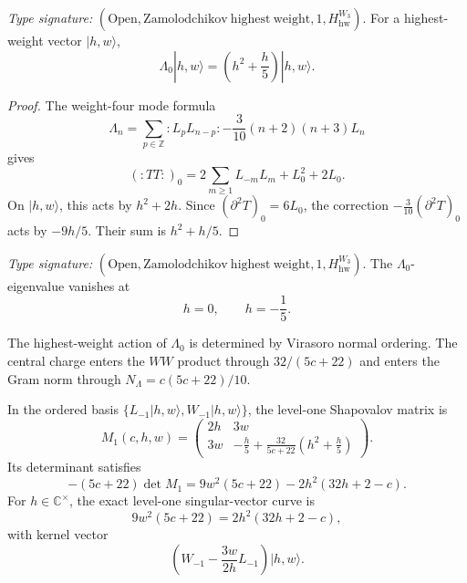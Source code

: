 \begin{proposition}
\label{prop:w3hol-lambda-on-primaries}
\emph{Type signature:}
\((\mathrm{Open},\mathrm{Zamolodchikov\ highest\ weight},1,
H_{\mathrm{hw}}^{W_3})\).
For a highest-weight vector \(|h,w\rangle\),
\begin{equation}\label{eq:w3hol-lambda-action}
\Lambda_0|h,w\rangle
=\left(h^2+\frac h5\right)|h,w\rangle.
\end{equation}
\end{proposition}

\begin{proof}
The weight-four mode formula
\[
\Lambda_n
=\sum_{p\in\mathbb Z}{:}L_pL_{n-p}{:}
-\frac3{10}(n+2)(n+3)L_n
\]
gives
\begin{equation}\label{eq:w3hol-tt-zero-mode}
({:}TT{:})_0
=2\sum_{m\geq1}L_{-m}L_m+L_0^2+2L_0.
\end{equation}
On \(|h,w\rangle\), this acts by \(h^2+2h\).  Since
\((\partial^2T)_0=6L_0\), the correction
\(-\frac3{10}(\partial^2T)_0\) acts by \(-9h/5\).  Their sum is
\(h^2+h/5\).
\end{proof}

\begin{corollary}
\label{cor:w3hol-lambda-roots}
\emph{Type signature:}
\((\mathrm{Open},\mathrm{Zamolodchikov\ highest\ weight},1,
H_{\mathrm{hw}}^{W_3})\).
The \(\Lambda_0\)-eigenvalue vanishes at
\[
h=0,\qquad h=-\frac15.
\]
\end{corollary}

\begin{remark}
\label{rem:w3hol-lambda-c-independent}
The highest-weight action of \(\Lambda_0\) is determined by Virasoro
normal ordering.  The central charge enters the \(WW\) product through
\(32/(5c+22)\) and enters the Gram norm through
\(N_\Lambda=c(5c+22)/10\).
\end{remark}

In the ordered basis
\(\{L_{-1}|h,w\rangle,W_{-1}|h,w\rangle\}\), the level-one
Shapovalov matrix is
\begin{equation}\label{eq:w3hol-level-one-gram}
M_1(c,h,w)=
\begin{pmatrix}
2h&3w\\[2pt]
3w&
-\frac h5+\frac{32}{5c+22}
\left(h^2+\frac h5\right)
\end{pmatrix}.
\end{equation}
Its determinant satisfies
\[
-(5c+22)\det M_1
=9w^2(5c+22)-2h^2(32h+2-c).
\]
For \(h\in\mathbb C^\times\), the exact level-one singular-vector
curve is
\begin{equation}\label{eq:w3hol-level-one-null-curve}
9w^2(5c+22)=2h^2(32h+2-c),
\end{equation}
with kernel vector
\[
\left(W_{-1}-\frac{3w}{2h}L_{-1}\right)|h,w\rangle.
\]

